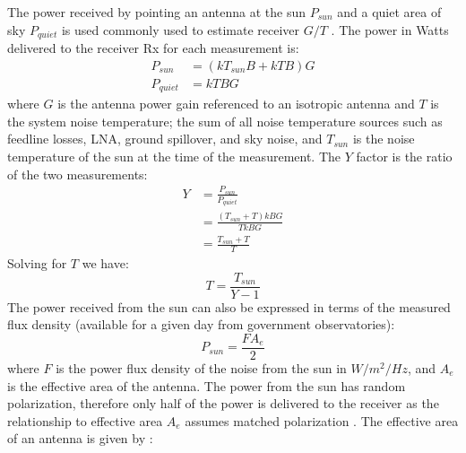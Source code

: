 \documentclass{article}
\begin{document}
\begin{center}

\end{center}

The power received by pointing an antenna at the sun $P_{sun}$ and a quiet area of sky $P_{quiet}$ is used commonly used to estimate receiver $G/T$ \cite{flagg2006_det_gt}.  The power in Watts delivered to the receiver Rx for each measurement is:
\begin{equation}
\begin{split}
P_{sun} &= (kT_{sun}B+kTB)G \\
P_{quiet} &= kTBG 
\end{split}
\end{equation}
where $G$ is the antenna power gain referenced to an isotropic antenna and $T$ is the system noise temperature; the sum of all noise temperature sources such as feedline losses, LNA, ground spillover, and sky noise, and $T_{sun}$ is the noise temperature of the sun at the time of the measurement. The $Y$ factor is the ratio of the two  measurements:
\begin{equation}
\begin{split}
Y &= \frac{P_{sun}}{P_{quiet}} \\
  &= \frac{(T_{sun}+T)kBG}{TkBG} \\
  &= \frac{T_{sun}+T}{T} 
\end{split}
\end{equation}
Solving for $T$ we have:
\begin{equation} \label{eq:T}
T = \frac{T_{sun}}{Y-1}
\end{equation}
The power received from the sun can also be expressed in terms of the measured flux density (available for a given day from government observatories):
\begin{equation} \label{eq:Psun}
P_{sun} = \frac{FA_e}{2}
\end{equation}
where $F$ is the power flux density of the noise from the sun in $W/m^2/Hz$, and $A_e$ is the effective area of the antenna. The power from the sun has random polarization, therefore only half of the power is delivered to the receiver as the relationship to effective area $A_e$ assumes matched polarization \cite[p 778]{kraus1988antennas}. The effective area of an antenna is given by \cite[Eq 2.3]{zavrel_antenna_physics}:
\end{document}
